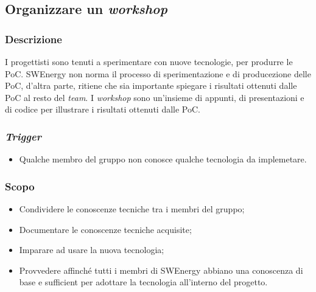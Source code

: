 \subsection{Organizzare un \textit{workshop}}
\label{organizzare-workshop}

\subsubsection{Descrizione}

I progettisti sono tenuti a sperimentare con nuove tecnologie, per produrre le
PoC. SWEnergy non norma il processo di sperimentazione e di producezione delle
PoC, d'altra parte, ritiene che sia importante spiegare i risultati ottenuti
dalle PoC al resto del \textit{team}. I \textit{workshop} sono un'insieme di
appunti, di presentazioni e di codice per illustrare i risultati ottenuti dalle
PoC.

\subsubsection{\textit{Trigger}}
\begin{itemize}
	\item Qualche membro del gruppo non conosce qualche tecnologia da
	      implemetare.
\end{itemize}

\subsubsection{Scopo}
\begin{itemize}
	\item Condividere le conoscenze tecniche tra i membri del gruppo;

	\item Documentare le conoscenze tecniche acquisite;

	\item Imparare ad usare la nuova tecnologia;

	\item Provvedere affinché tutti i membri di SWEnergy abbiano una conoscenza
	      di base e sufficient per adottare la tecnologia all'interno del
	      progetto.
\end{itemize}


